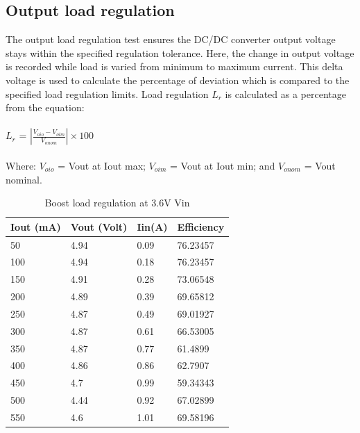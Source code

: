 \subsection{Output load regulation} 
The output load regulation test ensures the DC/DC converter output voltage stays within the specified regulation tolerance. Here, the change in output voltage is recorded while load is varied from minimum to maximum current. This delta voltage is used to calculate the percentage of deviation which is compared to the specified load regulation limits. Load regulation $L_{r}$ is calculated as a percentage from the equation:
\\ \\
\hspace*{5cm}$L_{r}$ = $\left | \frac{V_{oio}-V_{oim}}{V_{onom}} \right | \times 100$
\\ \\
Where:
$V_{oio}$ = Vout at Iout max; 
$V_{oim}$ = Vout at Iout min; and
$V_{onom}$ = Vout nominal.
\pagebreak
\begin{table}[H]
\centering
\begin{tabular}{|l|l|l|l|}
\hline
Iout (mA) & Vout (Volt) & Iin(A) & Efficiency \\ \hline
50        & 4.94        & 0.09   & 76.23457   \\ \hline
100       & 4.94        & 0.18   & 76.23457   \\ \hline
150       & 4.91        & 0.28   & 73.06548   \\ \hline
200       & 4.89        & 0.39   & 69.65812   \\ \hline
250       & 4.87        & 0.49   & 69.01927   \\ \hline
300       & 4.87        & 0.61   & 66.53005   \\ \hline
350       & 4.87        & 0.77   & 61.4899    \\ \hline
400       & 4.86        & 0.86   & 62.7907    \\ \hline
450       & 4.7         & 0.99   & 59.34343   \\ \hline
500       & 4.44        & 0.92   & 67.02899   \\ \hline
550       & 4.6         & 1.01   & 69.58196   \\ \hline
\end{tabular}
\caption{Boost load regulation at 3.6V Vin}
\label{table:4}
\end{table}
\\
